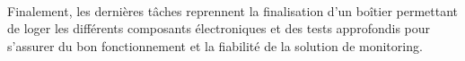 ~

\noindent
Finalement, les dernières tâches reprennent la finalisation d'un boîtier permettant de loger les différents composants électroniques et des tests approfondis pour s'assurer du bon fonctionnement et la fiabilité de la solution de monitoring.

%
